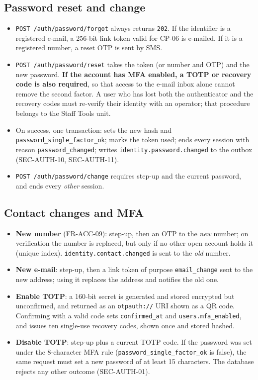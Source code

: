 \documentclass[11pt,a4paper]{article}
\begin{document}
\subsection{Password reset and change}
\begin{itemize}[nosep]
  \item \texttt{POST /auth/password/forgot} always returns \texttt{202}. If the identifier is a registered e-mail, a 256-bit link token valid for CP-06 is e-mailed. If it is a registered number, a reset OTP is sent by SMS.
  \item \texttt{POST /auth/password/reset} takes the token (or number and OTP) and the new password. \textbf{If the account has MFA enabled, a TOTP or recovery code is also required}, so that access to the e-mail inbox alone cannot remove the second factor. A user who has lost both the authenticator and the recovery codes must re-verify their identity with an operator; that procedure belongs to the Staff Tools unit.
  \item On success, one transaction: sets the new hash and \texttt{password\_single\_factor\_ok}; marks the token used; ends every session with reason \texttt{password\_changed}; writes \texttt{identity.password.changed} to the outbox (SEC-AUTH-10, SEC-AUTH-11).
  \item \texttt{POST /auth/password/change} requires step-up and the current password, and ends every \emph{other} session.
\end{itemize}

\subsection{Contact changes and MFA}
\begin{itemize}[nosep]
  \item \textbf{New number} (FR-ACC-09): step-up, then an OTP to the \emph{new} number; on verification the number is replaced, but only if no other open account holds it (unique index). \texttt{identity.contact.changed} is sent to the \emph{old} number.
  \item \textbf{New e-mail}: step-up, then a link token of purpose \texttt{email\_change} sent to the new address; using it replaces the address and notifies the old one.
  \item \textbf{Enable TOTP}: a 160-bit secret is generated and stored encrypted but unconfirmed, and returned as an \texttt{otpauth://} URI shown as a QR code. Confirming with a valid code sets \texttt{confirmed\_at} and \texttt{users.mfa\_enabled}, and issues ten single-use recovery codes, shown once and stored hashed.
  \item \textbf{Disable TOTP}: step-up plus a current TOTP code. If the password was set under the 8-character MFA rule (\texttt{password\_single\_factor\_ok} is false), the same request must set a new password of at least 15 characters. The database rejects any other outcome (SEC-AUTH-01).
\end{itemize}
\end{document}
